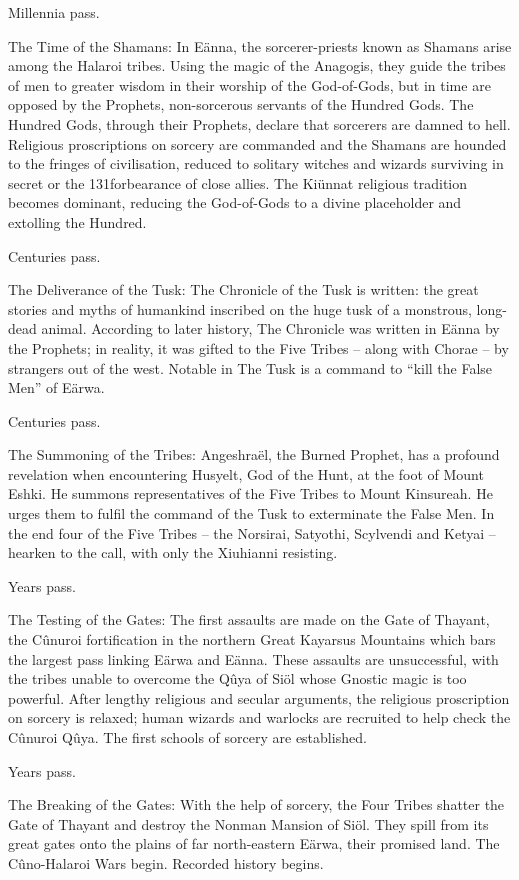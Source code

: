 \documentclass[]{book}
\begin{document}
Millennia pass.

The Time of the Shamans: In Eänna, the sorcerer-priests known as Shamans arise
among the Halaroi tribes. Using the magic of the Anagogis, they guide the tribes of
men to greater wisdom in their worship of the God-of-Gods, but in time are opposed by
the Prophets, non-sorcerous servants of the Hundred Gods. The Hundred Gods,
through their Prophets, declare that sorcerers are damned to hell. Religious
proscriptions on sorcery are commanded and the Shamans are hounded to the fringes
of civilisation, reduced to solitary witches and wizards surviving in secret or the
131forbearance of close allies. The Kiünnat religious tradition becomes dominant,
reducing the God-of-Gods to a divine placeholder and extolling the Hundred.

Centuries pass.

The Deliverance of the Tusk: The Chronicle of the Tusk is written: the great stories
and myths of humankind inscribed on the huge tusk of a monstrous, long-dead animal.
According to later history, The Chronicle was written in Eänna by the Prophets; in
reality, it was gifted to the Five Tribes -- along with Chorae -- by strangers out of the
west. Notable in The Tusk is a command to ``kill the False Men'' of Eärwa.

Centuries pass.

The Summoning of the Tribes: Angeshraël, the Burned Prophet, has a profound
revelation when encountering Husyelt, God of the Hunt, at the foot of Mount Eshki.
He summons representatives of the Five Tribes to Mount Kinsureah. He urges them to
fulfil the command of the Tusk to exterminate the False Men. In the end four of the
Five Tribes -- the Norsirai, Satyothi, Scylvendi and Ketyai -- hearken to the call, with
only the Xiuhianni resisting.

Years pass.

The Testing of the Gates: The first assaults are made on the Gate of Thayant, the
Cûnuroi fortification in the northern Great Kayarsus Mountains which bars the largest
pass linking Eärwa and Eänna. These assaults are unsuccessful, with the tribes unable to
overcome the Qûya of Siöl whose Gnostic magic is too powerful. After lengthy religious
and secular arguments, the religious proscription on sorcery is relaxed; human wizards
and warlocks are recruited to help check the Cûnuroi Qûya. The first schools of sorcery
are established.

Years pass.

The Breaking of the Gates: With the help of sorcery, the Four Tribes shatter the Gate
of Thayant and destroy the Nonman Mansion of Siöl. They spill from its great gates
onto the plains of far north-eastern Eärwa, their promised land. The Cûno-Halaroi
Wars begin. Recorded history begins.
\end{document}
